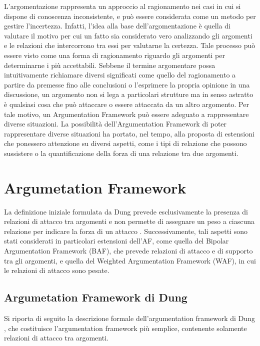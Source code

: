 



L'argomentazione rappresenta un approccio al ragionamento nei casi in cui si dispone di conoscenza inconsistente, e può essere considerata come un metodo per gestire l’incertezza. Infatti, l’idea alla base dell'argomentazione è quella di valutare il motivo per cui un fatto sia considerato vero analizzando gli argomenti e le relazioni che intercorrono tra essi per valutarne la certezza. Tale processo può essere visto come una forma di ragionamento riguardo gli argomenti per determinarne i più accettabili. Sebbene il termine argomentare possa intuitivamente richiamare diversi significati come quello del ragionamento a partire da premesse fino alle conclusioni o l'esprimere la propria opinione in una discussione, un argomento non si lega a particolari strutture ma in senso astratto è qualsiasi cosa che può attaccare o essere attaccata da un altro argomento. Per tale motivo, un Argumentation Framework può essere adeguato a rappresentare diverse situazioni. La possibilità dell'Argumentation Framework di poter rappresentare diverse situazioni ha portato, nel tempo, alla proposta di estensioni che ponessero attenzione su diversi aspetti, come i tipi di relazione che possono sussistere o la quantificazione della forza di una relazione tra due argomenti.

\section{Argumetation Framework}
La definizione iniziale formulata da Dung prevede esclusivamente la presenza di relazioni di attacco tra argomenti e non permette di assegnare un peso a ciascuna relazione per indicare la forza di un attacco \cite{dung1995acceptability}. Successivamente, tali aspetti sono stati considerati in particolari estensioni dell'AF, come quella del Bipolar Argumentation Framework (BAF), che prevede relazioni di attacco e di supporto tra gli argomenti, e quella del Weighted Argumentation Framework (WAF), in cui le relazioni di attacco sono pesate.


\subsection{Argumetation Framework di Dung}
Si riporta di seguito la descrizione formale dell'argumentation framework di Dung \cite{dung1995acceptability}, che costituisce l’argumentation framework più semplice, contenente solamente relazioni di attacco tra argomenti.

